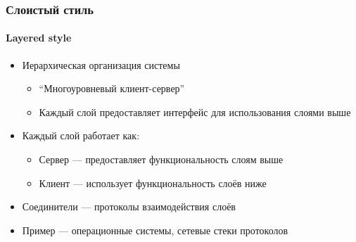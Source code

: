 \documentclass{../cscslides}
\begin{document}
    \begin{frame}
        \frametitle{Слоистый стиль}
        \framesubtitle{Layered style}
        \begin{itemize}
            \item Иерархическая организация системы
            \begin{itemize}
                \item ``Многоуровневый клиент-сервер''
                \item Каждый слой предоставляет интерфейс для использования слоями выше
            \end{itemize}
            \item Каждый слой работает как:
            \begin{itemize}
                \item Сервер --- предоставляет функциональность слоям выше
                \item Клиент --- использует функциональность слоёв ниже
            \end{itemize}
            \item Соединители --- протоколы взаимодействия слоёв
            \item Пример --- операционные системы, сетевые стеки протоколов
        \end{itemize}
    \end{frame}
\end{document}
